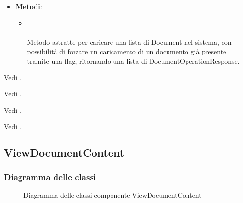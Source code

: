 \documentclass[10pt, a4paper]{article}
\begin{document}
\label{UploadDocumentsUseCaseDettaglio}
\begin{itemize}
    \item \textbf{Metodi}:
    \begin{itemize}
        \item {}\\ \\
        Metodo astratto per caricare una lista di Document nel sistema, con possibilità di forzare un caricamento di un documento già presente tramite una flag, ritornando una lista di DocumentOperationResponse.
    \end{itemize}
\end{itemize}





Vedi .

Vedi .


Vedi .

Vedi .




\subsection{ViewDocumentContent}
\subsubsection{Diagramma delle classi}

\begin{figure}[H]
    \centering        
    \caption{Diagramma delle classi componente ViewDocumentContent}
\end{figure}
\end{document}
